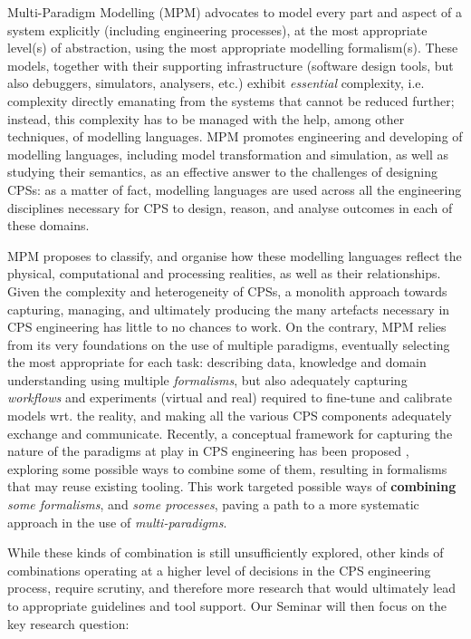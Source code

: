 Multi-Paradigm Modelling (MPM) advocates to model every part and aspect of a system
explicitly (including engineering processes), at the most appropriate level(s) 
of abstraction, using the most appropriate modelling formalism(s). These models,
together with their supporting infrastructure (software design tools, but also
debuggers, simulators, analysers, etc.) exhibit \emph{essential} complexity, i.e.
complexity directly emanating from the systems that cannot be reduced further;
instead, this complexity has to be managed with the help, among other techniques,
of modelling languages. MPM promotes engineering and developing of 
modelling languages, including model transformation and simulation, as well as
studying their semantics, as an effective answer to the challenges of designing
CPSs: as a matter of fact, modelling languages are used across all the engineering
disciplines necessary for CPS to design, reason, and analyse outcomes in each
of these domains.

MPM proposes to classify, and organise how these modelling languages reflect 
the physical, computational and processing realities, as well as their relationships.
Given the complexity and heterogeneity of CPSs, a monolith approach towards
capturing, managing, and ultimately producing the many artefacts necessary in
CPS engineering has little to no chances to work. On the contrary, MPM relies 
from its very foundations on the use of multiple paradigms, eventually selecting
the most appropriate for each task: describing data, knowledge and domain understanding 
using multiple \emph{formalisms}, but also adequately capturing \emph{workflows} 
and experiments (virtual and real) required to fine-tune and calibrate models 
wrt. the reality, and making all the various CPS components adequately exchange 
and communicate.
Recently, a conceptual framework for capturing the nature of the paradigms at 
play in CPS engineering has been proposed \cite{J:Amrani-etAl:2020}, exploring some 
possible ways to combine some of them, resulting in formalisms that may reuse
existing tooling. This work targeted possible ways of \textbf{combining} 
\emph{some formalisms}, and \emph{some processes}, paving a path to a more systematic
approach in the use of \emph{multi-paradigms}.

While these kinds of combination is still unsufficiently explored, other kinds
of combinations operating at a higher level of decisions in the CPS engineering
process, require scrutiny, and therefore more research that would ultimately
lead to appropriate guidelines and tool support. Our Seminar will then focus on
the key research question:


